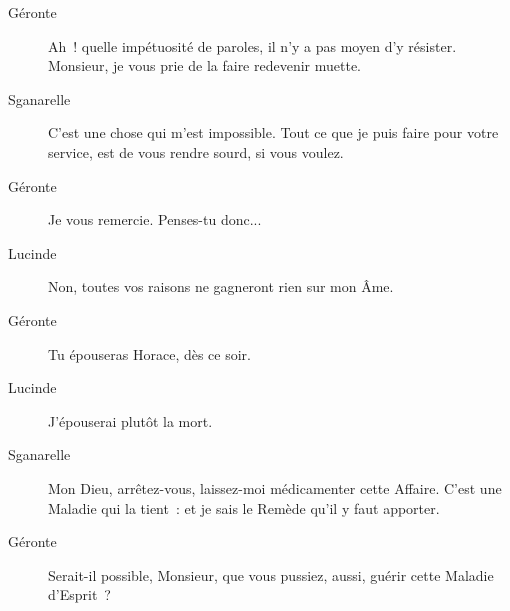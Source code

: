 \documentclass[french,twoside]{book} %
\begin{document}
 \begin{description} \item[Géronte] 

Ah ! quelle impétuosité de paroles, il n’y a pas moyen d’y résister. Monsieur, je vous prie de la faire redevenir muette.\end{description}
 \begin{description} \item[Sganarelle] 

C’est une chose qui m’est impossible. Tout ce que je puis faire pour votre service, est de vous rendre sourd, si vous voulez.\end{description}
 \begin{description} \item[Géronte] 

Je vous remercie. Penses-tu donc...\end{description}
 \begin{description} \item[Lucinde] 

Non, toutes vos raisons ne gagneront rien sur mon Âme.\end{description}
 \begin{description} \item[Géronte] 

Tu épouseras Horace, dès ce soir.\end{description}
 \begin{description} \item[Lucinde] 

J’épouserai plutôt la mort.\end{description}
 \begin{description} \item[Sganarelle] 

Mon Dieu, arrêtez-vous, laissez-moi médicamenter cette Affaire. C’est une Maladie qui la tient : et je sais le Remède qu’il y faut apporter.\end{description}
 \begin{description} \item[Géronte] 

Serait-il possible, Monsieur, que vous pussiez, aussi, guérir cette Maladie d’Esprit ?\end{description}
\end{document}
